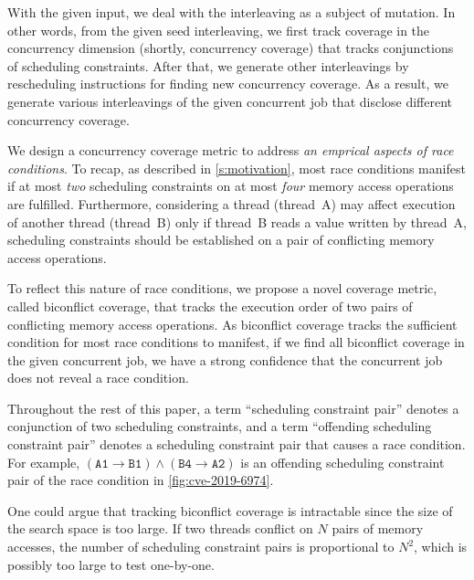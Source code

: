 With the given input, we deal with the interleaving as a subject of
mutation. In other words, from the given seed interleaving, we first
track coverage in the concurrency dimension (shortly, concurrency
coverage) that tracks conjunctions of scheduling constraints. After
that, we generate other interleavings by rescheduling instructions for
finding new concurrency coverage.
%
As a result, we generate various interleavings of the given concurrent
job that disclose different concurrency coverage.
%
%

%
We design a concurrency coverage metric to address \textit{an emprical
  aspects of race conditions}.
%
To recap, as described in \autoref{s:motivation}, most race conditions
manifest if at most \textit{two} scheduling constraints on at most
\textit{four} memory access operations are fulfilled.
%
Furthermore, considering a thread (thread~A) may affect execution of
another thread (thread~B) only if thread~B reads a value written by
thread~A, scheduling constraints should be established on a pair of
conflicting memory access operations.

To reflect this nature of race conditions, we propose a novel coverage
metric, called biconflict coverage, that tracks the execution order of
two pairs of conflicting memory access operations.
%
As biconflict coverage tracks the sufficient condition for most race
conditions to manifest, if we find all biconflict coverage in the
given concurrent job, we have a strong confidence that the concurrent
job does not reveal a race condition.

Throughout the rest of this paper, a term ``scheduling constraint
pair'' denotes a conjunction of two scheduling constraints, and a term
``offending scheduling constraint pair'' denotes a scheduling
constraint pair that causes a race condition.  For example,
$(\texttt{A1} \rightarrow \texttt{B1}) \wedge (\texttt{B4} \rightarrow
\texttt{A2})$ is an offending scheduling constraint pair of the race
condition in \autoref{fig:cve-2019-6974}.

%
%
One could argue that tracking biconflict coverage is intractable since
the size of the search space is too large.
%
If two threads conflict on $N$ pairs of memory accesses, the number of
scheduling constraint pairs is proportional to $N^2$, which is possibly
too large to test one-by-one.

